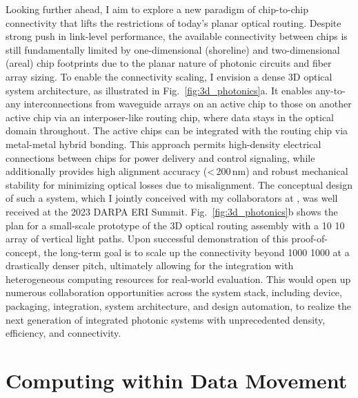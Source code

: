 Looking further ahead, I aim to explore a new paradigm of chip-to-chip connectivity that lifts the restrictions of today's planar optical routing. Despite strong push in link-level performance, the available connectivity between chips is still fundamentally limited by one-dimensional (shoreline) and two-dimensional (areal) chip footprints due to the planar nature of photonic circuits and fiber array sizing. To enable the connectivity scaling, I envision a dense 3D optical system architecture, as illustrated in Fig.~\ref{fig:3d_photonics}a. It enables any-to-any interconnections from waveguide arrays on an active chip to those on another active chip via an interposer-like routing chip, where data stays in the optical domain throughout. The active chips can be integrated with the routing chip via metal-metal hybrid bonding. This approach permits high-density electrical connections between chips for power delivery and control signaling, while
additionally provides high alignment accuracy (<\,200\,nm) and robust mechanical stability for minimizing optical losses due to misalignment. The conceptual design of such a system, which I jointly conceived with my collaborators at \mySchoolShort{},
was well received at the 2023 DARPA ERI Summit. Fig.~\ref{fig:3d_photonics}b shows the plan for a small-scale prototype of the 3D optical routing assembly with a 10 \texttimes{} 10 array of vertical light paths. Upon successful demonstration of this proof-of-concept, the long-term goal is to scale up the connectivity beyond 1000 \texttimes{} 1000 at a drastically denser pitch, ultimately allowing for the integration with heterogeneous computing resources for real-world evaluation. This would open up numerous collaboration opportunities across the system stack, including device, packaging, integration, system architecture, and design automation, to realize the next generation of integrated photonic systems with unprecedented density, efficiency, and connectivity.

\section*{Computing within Data Movement}


